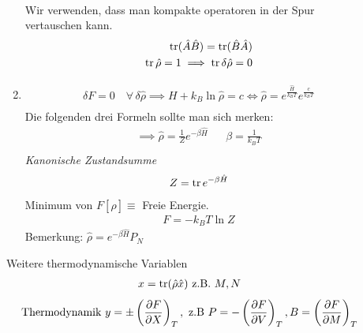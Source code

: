 \begin{description}
\begin{enumerate}
\begin{align*}
      \end{align*}
      Wir verwenden, dass man kompakte operatoren in der Spur vertauschen kann.
      \begin{align*}
        \operatorname{tr} (\hat{A} \hat{B}) = \operatorname{tr} (\hat{B} \hat{A})  \\
        \operatorname{tr} \hat{\rho} = 1 \implies \operatorname{tr} \delta \hat{\rho} = 0
      \end{align*}
    \item
      \begin{align*}
        \delta F = 0 \quad\forall\, \delta \hat{\rho} \implies 
        H + k_B \ln{\hat{\rho}} = c \iff
        \hat{\rho} = e^{ \frac{\hat{H}}{k_B T} } e^{ \frac{c}{ k_B T}} \\
      \end{align*}
      Die folgenden drei Formeln sollte man sich merken:
      \begin{align*}
        \implies \hat{\rho} = \frac{1}{Z} e^{-\beta \hat{H}} && \beta = \frac{1}{k_B T} \\
      \end{align*}
      \emph{Kanonische Zustandsumme}
      \begin{align*}
         Z = \operatorname{tr} e^{-\beta \hat{H}} 
      \end{align*}
      Minimum von $F[\hat{\rho}] \equiv $ Freie Energie.
      \begin{align*}
        F = -k_B T \ln{Z} 
      \end{align*}
      Bemerkung: $\hat{\rho} = e^{-\beta \hat{H}} P_N$ %
    \end{enumerate}
    Weitere thermodynamische Variablen %
    \begin{align*}
      x = \operatorname{tr} (\hat{\rho} \hat{x}) \text{ z.B. } M,N
    \end{align*}
    \begin{align*}
      \text{Thermodynamik } y = \pm \left( \frac{\partial F }{\partial X}  \right)_T, 
      \text{ z.B } P = - \left( \frac{\partial F }{\partial V} \right)_T, B = 
      \left( \frac{\partial F }{\partial M} \right)_T
    \end{align*}
\end{description}
